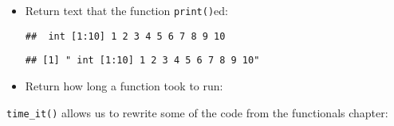 \begin{itemize}
\item
  Return text that the function \texttt{print()}ed:

\begin{Shaded}
\begin{Highlighting}[]
\StringTok{ }
    \NormalTok{(}
\NormalTok{  \}}
\NormalTok{\}}
\StringTok{ }
\NormalTok{(}\OperatorTok{:}\NormalTok{)}
\end{Highlighting}
\end{Shaded}

\begin{verbatim}
##  int [1:10] 1 2 3 4 5 6 7 8 9 10
\end{verbatim}

\begin{Shaded}
\begin{Highlighting}[]
\NormalTok{(}\OperatorTok{:}\NormalTok{)}
\end{Highlighting}
\end{Shaded}

\begin{verbatim}
## [1] " int [1:10] 1 2 3 4 5 6 7 8 9 10"
\end{verbatim}
\item
  Return how long a function took to run: 

\begin{Shaded}
\begin{Highlighting}[]
\StringTok{ }
    \NormalTok{(}
\NormalTok{  \}}
\NormalTok{\}}
\end{Highlighting}
\end{Shaded}
\end{itemize}

\texttt{time\_it()} allows us to rewrite some of the code from the
functionals chapter:

